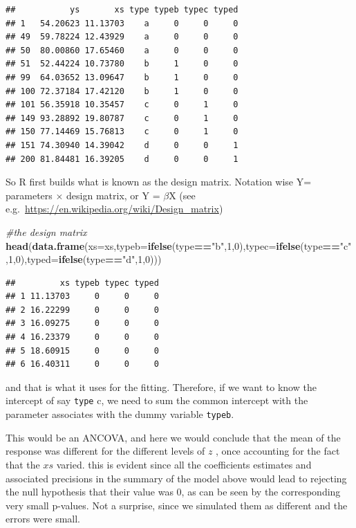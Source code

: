 \documentclass[
]{book}
\newenvironment{Shaded}{\begin{snugshade}}{\end{snugshade}}
\newcommand{\CommentTok}[1]{\textcolor[rgb]{0.56,0.35,0.01}{\textit{#1}}}
\newcommand{\DataTypeTok}[1]{\textcolor[rgb]{0.13,0.29,0.53}{#1}}
\newcommand{\DecValTok}[1]{\textcolor[rgb]{0.00,0.00,0.81}{#1}}
\newcommand{\KeywordTok}[1]{\textcolor[rgb]{0.13,0.29,0.53}{\textbf{#1}}}
\newcommand{\NormalTok}[1]{#1}
\newcommand{\OperatorTok}[1]{\textcolor[rgb]{0.81,0.36,0.00}{\textbf{#1}}}
\newcommand{\StringTok}[1]{\textcolor[rgb]{0.31,0.60,0.02}{#1}}
\begin{document}
\begin{verbatim}
##           ys       xs type typeb typec typed
## 1   54.20623 11.13703    a     0     0     0
## 49  59.78224 12.43929    a     0     0     0
## 50  80.00860 17.65460    a     0     0     0
## 51  52.44224 10.73780    b     1     0     0
## 99  64.03652 13.09647    b     1     0     0
## 100 72.37184 17.42120    b     1     0     0
## 101 56.35918 10.35457    c     0     1     0
## 149 93.28892 19.80787    c     0     1     0
## 150 77.14469 15.76813    c     0     1     0
## 151 74.30940 14.39042    d     0     0     1
## 200 81.84481 16.39205    d     0     0     1
\end{verbatim}

So R first builds what is known as the design matrix. Notation wise Y= parameters \(\times\) design matrix, or Y = \(\beta\)X (see e.g.~\url{https://en.wikipedia.org/wiki/Design_matrix})

\begin{Shaded}
\begin{Highlighting}[]
\CommentTok{#the design matrix}
\KeywordTok{head}\NormalTok{(}\KeywordTok{data.frame}\NormalTok{(}\DataTypeTok{xs=}\NormalTok{xs,}\DataTypeTok{typeb=}\KeywordTok{ifelse}\NormalTok{(type}\OperatorTok{==}\StringTok{"b"}\NormalTok{,}\DecValTok{1}\NormalTok{,}\DecValTok{0}\NormalTok{),}\DataTypeTok{typec=}\KeywordTok{ifelse}\NormalTok{(type}\OperatorTok{==}\StringTok{"c"}\NormalTok{,}\DecValTok{1}\NormalTok{,}\DecValTok{0}\NormalTok{),}\DataTypeTok{typed=}\KeywordTok{ifelse}\NormalTok{(type}\OperatorTok{==}\StringTok{"d"}\NormalTok{,}\DecValTok{1}\NormalTok{,}\DecValTok{0}\NormalTok{)))}
\end{Highlighting}
\end{Shaded}

\begin{verbatim}
##         xs typeb typec typed
## 1 11.13703     0     0     0
## 2 16.22299     0     0     0
## 3 16.09275     0     0     0
## 4 16.23379     0     0     0
## 5 18.60915     0     0     0
## 6 16.40311     0     0     0
\end{verbatim}

and that is what it uses for the fitting. Therefore, if we want to know the intercept of say \texttt{type} c, we need to sum the common intercept with the parameter associates with the dummy variable \texttt{typeb}.

This would be an ANCOVA, and here we would conclude that the mean of the response was different for the different levels of \(z\) , once accounting for the fact that the \(xs\) varied. this is evident since all the coefficients estimates and associated precisions in the summary of the model above would lead to rejecting the null hypothesis that their value was 0, as can be seen by the corresponding very small p-values. Not a surprise, since we simulated them as different and the errors were small.
\end{document}
